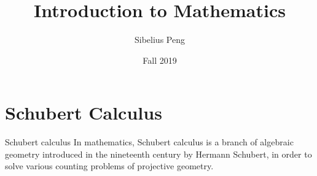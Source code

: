 \newenvironment{corr}[1][]{
	\refstepcounter{mythmctr}%
	\tcolorbox[beamer,%
	noparskip,breakable,
	colback=corback,colframe=cortop,%
	title={\bfseries Corrollary \themythmctr{\ifthenelse{\equal{#1}{}}{}{: #1}}}]  \label{thm:\themythmctr}
}%
{\endtcolorbox}


\newenvironment{prop}[1][]{
	\refstepcounter{mythmctr}%
	\tcolorbox[beamer,%
	noparskip,breakable,
	colback=propback,colframe=proptop,%
	title={\bfseries Proposition \themythmctr{\ifthenelse{\equal{#1}{}}{}{: #1}}}]  \label{thm:\themythmctr}
}%
{\endtcolorbox}



\newenvironment{eqbox}[1][]{
	\tcolorbox[textmarker,colback=DarkOrange!5!white,
	colframe=DarkOrange!75!yellow]
	\textit{#1}
}%
{\endtcolorbox}


\newenvironment{pf}{%
	{\calligra Proof:}
	\tcolorbox[blanker,breakable,left=5mm,
	before skip=10pt,after skip=10pt,
	borderline west={1mm}{0pt}{red}]
}%
{\qed \endtcolorbox}

\newenvironment{ex}{%
	{\calligra Example:}
	\tcolorbox[blanker,breakable,left=5mm,
	before skip=10pt,after skip=10pt,
	borderline west={1mm}{0pt}{blue}]
}%
{\endtcolorbox}

\newenvironment{remark}{%
	{\calligra Remark:}
	\tcolorbox[blanker,breakable,left=5mm,
	before skip=10pt,after skip=10pt,
	borderline west={1mm}{0pt}{pink}]
}%
{\endtcolorbox}


\newcommand{\defnref}[1]{\hyperref[defn:#1]{#1}}
\newcommand{\thmref}[1]{Theorem \ref{thm:#1}}
\newcommand{\lemmaref}[1]{Lemma \ref{thm:#1}}
\newcommand{\corref}[1]{Corollary \ref{thm:#1}}
\newcommand{\propref}[1]{Proposition \ref{thm:#1}}
\makeindex





\title{Introduction to Mathematics}
\author{Sibelius Peng}
\date{Fall 2019}



\maketitle
{
	\hypersetup{linkbordercolor=white}
	\tableofcontents
}

\newpage
\pagestyle{headings}


\chapter{Schubert Calculus}
\begin{defn}{Schubert calculus}
In mathematics, Schubert calculus is a branch of algebraic geometry introduced in the nineteenth century by Hermann Schubert, in order to solve various counting problems of projective geometry.
\end{defn}

